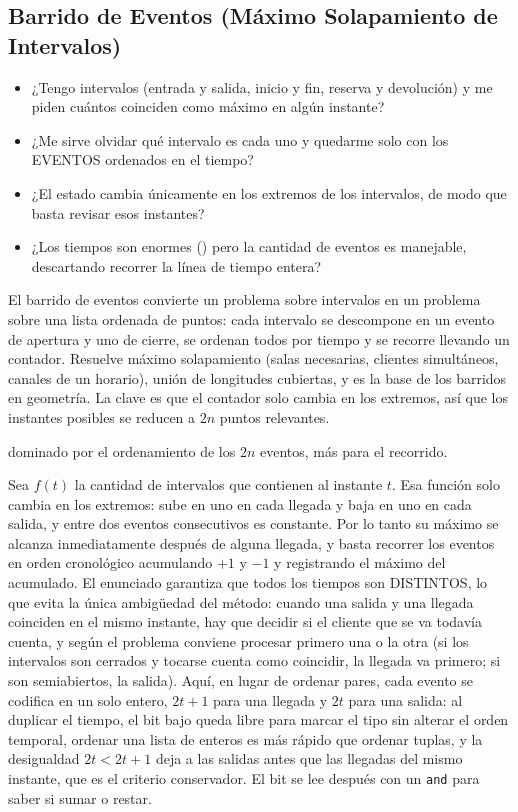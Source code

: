\subsection{Barrido de Eventos (Máximo Solapamiento de Intervalos)}
\label{alg:5-5}


\begin{itemize}
\item ¿Tengo intervalos (entrada y salida, inicio y fin, reserva y devolución) y me piden cuántos coinciden como máximo en algún instante?
\item ¿Me sirve olvidar qué intervalo es cada uno y quedarme solo con los EVENTOS ordenados en el tiempo?
\item ¿El estado cambia únicamente en los extremos de los intervalos, de modo que basta revisar esos instantes?
\item ¿Los tiempos son enormes () pero la cantidad de eventos es manejable, descartando recorrer la línea de tiempo entera?
\end{itemize}

 El barrido de eventos convierte un problema sobre intervalos en un problema sobre una lista ordenada de puntos: cada intervalo se descompone en un evento de apertura y uno de cierre, se ordenan todos por tiempo y se recorre llevando un contador. Resuelve máximo solapamiento (salas necesarias, clientes simultáneos, canales de un horario), unión de longitudes cubiertas, y es la base de los barridos en geometría. La clave es que el contador solo cambia en los extremos, así que los  instantes posibles se reducen a $2n$ puntos relevantes.

  dominado por el ordenamiento de los $2n$ eventos, más  para el recorrido.

 Sea $f(t)$ la cantidad de intervalos que contienen al instante $t$. Esa función solo cambia en los extremos: sube en uno en cada llegada y baja en uno en cada salida, y entre dos eventos consecutivos es constante. Por lo tanto su máximo se alcanza inmediatamente después de alguna llegada, y basta recorrer los eventos en orden cronológico acumulando $+1$ y $-1$ y registrando el máximo del acumulado. El enunciado garantiza que todos los tiempos son DISTINTOS, lo que evita la única ambigüedad del método: cuando una salida y una llegada coinciden en el mismo instante, hay que decidir si el cliente que se va todavía cuenta, y según el problema conviene procesar primero una o la otra (si los intervalos son cerrados y tocarse cuenta como coincidir, la llegada va primero; si son semiabiertos, la salida). Aquí, en lugar de ordenar pares, cada evento se codifica en un solo entero, $2t+1$ para una llegada y $2t$ para una salida: al duplicar el tiempo, el bit bajo queda libre para marcar el tipo sin alterar el orden temporal, ordenar una lista de enteros es más rápido que ordenar tuplas, y la desigualdad $2t < 2t+1$ deja a las salidas antes que las llegadas del mismo instante, que es el criterio conservador. El bit se lee después con un \texttt{and} para saber si sumar o restar.~\cite{shamos1976}

